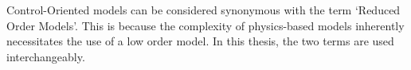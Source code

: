 



\graphicspath{{4/figures/}}










Control-Oriented  models can  be considered  synonymous with  the term  `Reduced
Order Models'. This is because the complexity of physics-based models inherently
necessitates the  use of a low  order model. In  this thesis, the two  terms are
used interchangeably.


